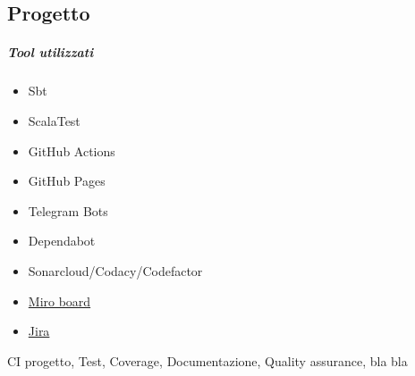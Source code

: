     \subsection{Progetto}
        \subparagraph{Tool utilizzati}
        \begin{itemize}
            \item Sbt
            \item ScalaTest
            \item GitHub Actions
            \item GitHub Pages
            \item Telegram Bots
            \item Dependabot
            \item Sonarcloud/Codacy/Codefactor
            \item \href{https://miro.com/app/board/uXjVPN93uLs=/?share_link_id=56431555728}{Miro board}
            \item  \href{https://riccardo-omiccioli.atlassian.net/jira/software/projects/IQ/boards/1/roadmap}{Jira}
        \end{itemize}
    CI progetto, Test, Coverage, Documentazione, Quality assurance, bla bla
        







